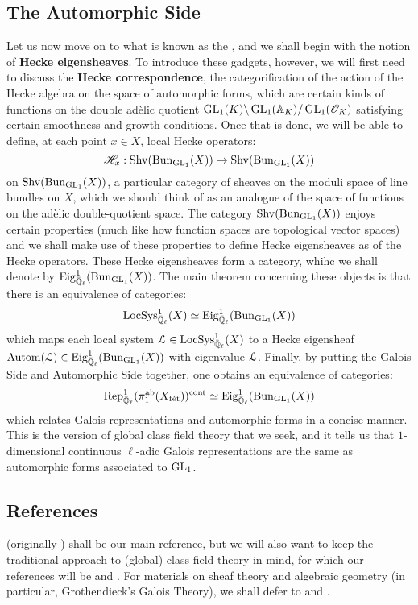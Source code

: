         \subsection{The Automorphic Side}
            Let us now move on to what is known as the , and we shall begin with the notion of \textbf{Hecke eigensheaves}. To introduce these gadgets, however, we will first need to discuss the \textbf{Hecke correspondence}, the categorification of the action of the Hecke algebra on the space of automorphic forms, which are certain kinds of functions on the double ad\`elic quotient $\operatorname{GL}_1(K) \backslash \operatorname{GL}_1(\mathbb{A}_K) / \operatorname{GL}_1(\mathscr{O}_K)$ satisfying certain smoothness and growth conditions. Once that is done, we will be able to define, at each point $x \in X$, local Hecke operators:
                $$\mathscr{H}_x: \mathrm{Shv}(\mathrm{Bun}_{\operatorname{GL}_1}(X)) \to \mathrm{Shv}(\mathrm{Bun}_{\operatorname{GL}_1}(X))$$
            on $\mathrm{Shv}(\mathrm{Bun}_{\operatorname{GL}_1}(X))$, a particular category of sheaves on the moduli space of line bundles on $X$, which we should think of as an analogue of the space of functions on the ad\`elic double-quotient space. The category $\mathrm{Shv}(\mathrm{Bun}_{\operatorname{GL}_1}(X))$ enjoys certain  properties (much like how function spaces are topological vector spaces) and we shall make use of these properties to define Hecke eigensheaves as  of the Hecke operators. These Hecke eigensheaves form a category, whihc we shall denote by $\mathrm{Eig}^1_{\bar{\mathbb{Q}}_{\ell}}(\mathrm{Bun}_{\operatorname{GL}_1}(X))$. The main theorem concerning these objects is that there is an equivalence of categories:
                $$\mathrm{LocSys}_{\bar{\mathbb{Q}}_{\ell}}^1(X) \simeq \mathrm{Eig}^1_{\bar{\mathbb{Q}}_{\ell}}(\mathrm{Bun}_{\operatorname{GL}_1}(X))$$
            which maps each local system $\mathcal{L} \in \mathrm{LocSys}_{\bar{\mathbb{Q}}_{\ell}}^1(X)$ to a Hecke eigensheaf $\mathrm{Autom}(\mathcal{L}) \in \mathrm{Eig}^1_{\bar{\mathbb{Q}}_{\ell}}(\mathrm{Bun}_{\operatorname{GL}_1}(X))$ with eigenvalue $\mathcal{L}$. Finally, by putting the Galois Side and Automorphic Side together, one obtains an equivalence of categories:
                $$\mathrm{Rep}_{\bar{\mathbb{Q}}_{\ell}}^1(\pi_1^{\mathrm{ab}}(X_{\mathrm{f\acute{e}t}}))^{\mathrm{cont}} \simeq \mathrm{Eig}^1_{\bar{\mathbb{Q}}_{\ell}}(\mathrm{Bun}_{\operatorname{GL}_1}(X))$$
            which relates Galois representations and automorphic forms in a concise manner. This is the version of global class field theory that we seek, and it tells us that $1$-dimensional continuous $\ell$-adic Galois representations are the same as automorphic forms associated to $\operatorname{GL}_1$.
	    
        \subsection{References}
    	    \cite{tendler_2015_geometric_class_field_theory} (originally \cite{tendler_2010_geometric_class_field_theory_original}) shall be our main reference, but we will also want to keep the traditional approach to (global) class field theory in mind, for which our references will be \cite[Chapter VI]{neukirch_2010_algebraic_number_theory} and \cite[Chapter VIII]{neukirch_1999_cohomology_of_number_field}. For materials on sheaf theory and algebraic geometry (in particular, Grothendieck's Galois Theory), we shall defer to \cite{stacks} and \cite[Expos\'e V]{SGA1}. 
    	    
	\printbibliography

